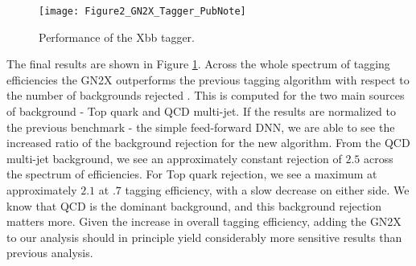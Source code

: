 \documentclass[12pt]{article}
\begin{document}

\begin{figure}[t!]
    \centering
    \texttt{[image: Figure2\_GN2X\_Tagger\_PubNote]}
    \caption{Performance of the Xbb tagger.}
    \label{fig:Xbb_tagger}
\end{figure}

The final results are shown in Figure \ref{fig:Xbb_tagger}. Across the whole
spectrum of tagging efficiencies the GN2X outperforms the previous tagging
algorithm with respect to the number of backgrounds rejected
\cite{boosted_hbbcc_tagger}. This is computed for the two main sources of
background - Top quark and QCD multi-jet. If the results are normalized to the
previous benchmark - the simple feed-forward DNN, we are able to see the
increased ratio of the background rejection for the new algorithm. From the QCD
multi-jet background, we see an approximately constant rejection of $2.5$ across
the spectrum of efficiencies. For Top quark rejection, we see a maximum at
approximately $2.1$ at $.7$ tagging efficiency, with a slow decrease on either
side. We know that QCD is the dominant background, and this background rejection
matters more. Given the increase in overall tagging efficiency, adding the GN2X
to our analysis should in principle yield considerably more sensitive results
than previous analysis.
\end{document}
